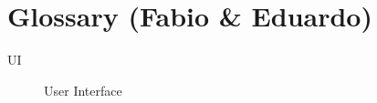 \section{Glossary (Fabio \& Eduardo)}
\begin{description}
 \item[UI] User Interface 
\end{description}